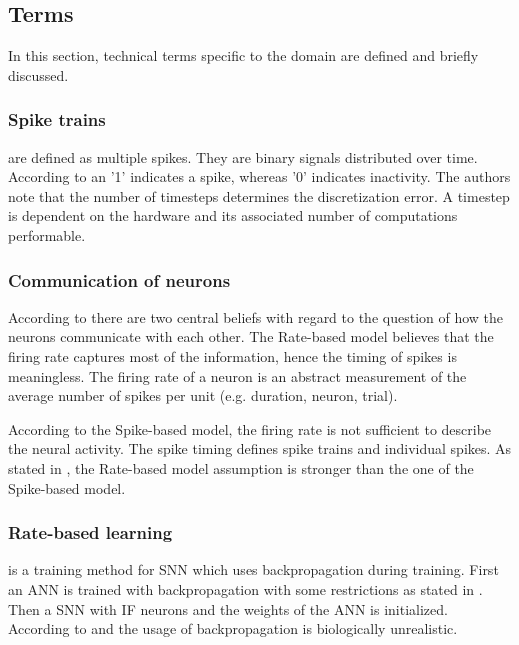 \newcommand\rbModel{Rate-based model}
\newcommand\sbModel{Spike-based model}
\subsection{Terms}
\label{subsec:terms}

In this section, technical terms specific to the domain are defined and briefly discussed.

\subsubsection{Spike trains}
are defined as multiple spikes.
They are binary signals distributed over time.
According to \cite{DIET_SNN} an '1' indicates a spike, whereas '0' indicates inactivity.
The authors note that the number of timesteps determines the discretization error.
A timestep is dependent on the hardware and its associated number of computations performable.

\subsubsection{Communication of neurons}
\label{subsubsec:communication}
According to \cite{spike_vs_rate} there are two central beliefs with regard to the question of how the neurons communicate with each other.
The \rbModel{} believes that the firing rate captures most of the information, hence the timing of spikes is meaningless.
The firing rate of a neuron is an abstract measurement of the average number of spikes per unit (e.g. duration, neuron, trial).

According to the \sbModel{}, the firing rate is not sufficient to describe the neural activity.
The spike timing defines spike trains and individual spikes.
As stated in \cite{spike_vs_rate}, the \rbModel{} assumption is stronger than the one of the \sbModel{}.

\subsubsection{Rate-based learning} is a training method for \ac{SNN} which uses backpropagation during training. 
First an \ac{ANN} is trained with backpropagation with some restrictions as stated in \cite{DIET_SNN}.
Then a \ac{SNN} with \ac{IF} neurons and the weights of the \ac{ANN} is initialized.
According to \cite{SNN} and \cite{STDP_like} the usage of backpropagation is biologically unrealistic.
